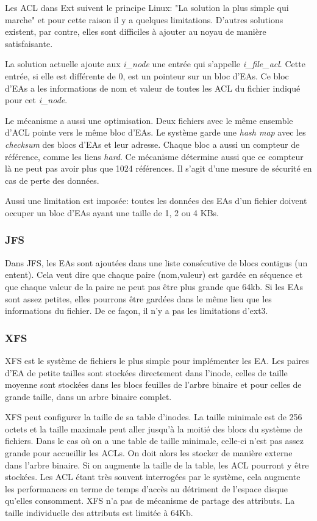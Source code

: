 \documentclass{article}
\begin{document}
Les ACL dans Ext suivent le principe Linux: "La solution la plus simple qui marche" et pour cette raison il y a quelques limitations. D'autres solutions existent, par contre, elles sont difficiles à ajouter au noyau de manière satisfaisante\cite{ext_acl}.
 
La solution actuelle ajoute aux \emph{i\_node} une entrée qui s'appelle \emph{i\_file\_acl}. Cette entrée, si elle est différente de 0, est un pointeur sur un bloc d'EAs. Ce bloc d'EAs a les informations de nom et valeur de toutes les ACL du fichier indiqué pour cet \emph{i\_node}.
 
Le mécanisme a aussi une optimisation. Deux fichiers avec le même ensemble d'ACL pointe vers le même bloc d'EAs. Le système garde une \emph{hash map} avec les \emph{checksum} des blocs d'EAs et leur adresse. Chaque bloc a aussi un compteur de référence, comme les liens \emph{hard}. Ce mécanisme détermine aussi que ce compteur là ne peut pas avoir plus que 1024 références. Il s'agit d'une mesure de sécurité en cas de perte des données.
 
Aussi une limitation est imposée: toutes les données des EAs d'un fichier doivent occuper un bloc d'EAs ayant une taille de 1, 2 ou 4 KBs.
 
 
\subsubsection{JFS}
 
Dans JFS, les EAs sont ajoutées dans une liste consécutive de blocs contigus (un entent).  Cela veut dire que chaque paire (nom,valeur) est gardée en séquence et que chaque valeur de la paire ne peut pas être plus grande que 64kb. Si les EAs sont assez petites, elles pourrons être gardées dans le même lieu que les informations du fichier. De ce façon, il n'y a pas les limitations d'ext3.
 
\subsubsection{XFS}
XFS est le système de fichiers le plus simple pour implémenter les EA. Les paires d'EA de petite tailles sont stockées directement dans l'inode, celles de taille moyenne sont stockées dans les blocs feuilles de l'arbre binaire et pour celles de grande taille, dans un arbre binaire complet.

XFS peut configurer la taille de sa table d'inodes. La taille minimale est de 256 octets et la taille maximale peut aller jusqu'à la moitié des blocs du système de fichiers. Dans le cas où on a une table de taille minimale, celle-ci n'est pas assez grande pour accueillir les ACLs. On doit alors les stocker de manière externe dans l'arbre binaire. Si on augmente la taille de la table, les ACL pourront y être stockées. Les ACL étant très souvent interrogées par le système, cela augmente les performances en terme de temps d'accès au détriment de l'espace disque qu'elles consomment.
XFS n'a pas de mécanisme de partage des attributs. La taille individuelle des attributs est limitée à 64Kb.
 
\end{document}
